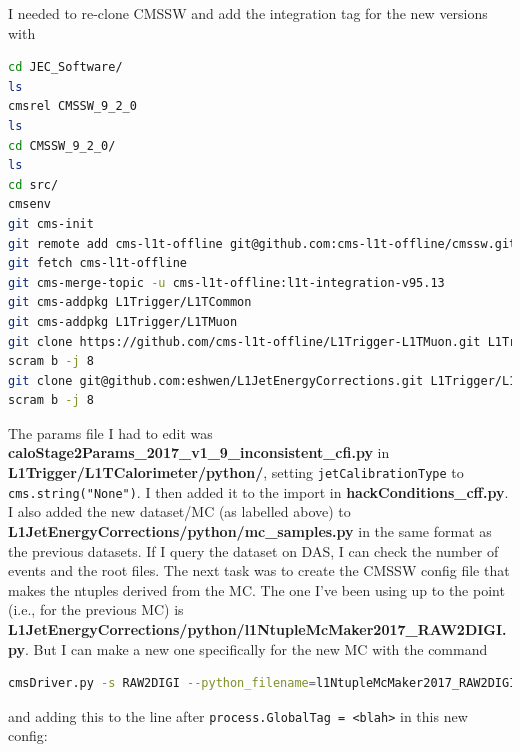 I needed to re-clone CMSSW and add the integration tag for the new versions with

\begin{lstlisting}[belowskip=-0.7cm, language=sh]
cd JEC_Software/
ls
cmsrel CMSSW_9_2_0
ls
cd CMSSW_9_2_0/
ls
cd src/
cmsenv
git cms-init
git remote add cms-l1t-offline git@github.com:cms-l1t-offline/cmssw.git
git fetch cms-l1t-offline
git cms-merge-topic -u cms-l1t-offline:l1t-integration-v95.13
git cms-addpkg L1Trigger/L1TCommon
git cms-addpkg L1Trigger/L1TMuon
git clone https://github.com/cms-l1t-offline/L1Trigger-L1TMuon.git L1Trigger/L1TMuon/data
scram b -j 8
git clone git@github.com:eshwen/L1JetEnergyCorrections.git L1Trigger/L1JetEnergyCorrections
scram b -j 8
\end{lstlisting}

The params file I had to edit was \textbf{caloStage2Params\_2017\_v1\_9\_inconsistent\_cfi.py} in \textbf{L1Trigger/L1TCalorimeter/python/}, setting \texttt{jetCalibrationType} to \texttt{cms.string("None")}. I then added it to the import in \textbf{hackConditions\_cff.py}. I also added the new dataset/MC (as labelled above) to \textbf{L1JetEnergyCorrections/python/mc\_samples.py} in the same format as the previous datasets. If I query the dataset on DAS, I can check the number of events and the root files. The next task was to create the CMSSW config file that makes the ntuples derived from the MC. The one I've been using up to the point (i.e., for the previous MC) is \textbf{L1JetEnergyCorrections/python/l1NtupleMcMaker2017\_RAW2DIGI.py}. But I can make a new one specifically for the new MC with the command

\begin{lstlisting}[belowskip=-0.7cm, language=sh, numbers=none]
cmsDriver.py -s RAW2DIGI --python_filename=l1NtupleMcMaker2017_RAW2DIGI_reEmu_HCAL_TPs.py -n 100 --no_output --no_exec --era=Run2_2017 --mc --conditions=92X_upgrade2017_TSG_For90XSamples_V1 --customise=L1Trigger/Configuration/customiseReEmul.L1TReEmulMCFrom90xRAWSimHcalTP --customise=L1Trigger/L1TNtuples/customiseL1Ntuple.L1NtupleRAWEMUGEN_MC --customise=L1Trigger/Configuration/customiseSettings.L1TSettingsToCaloStage2Params_2017_v1_9_inconsistent --filein=/store/mc/PhaseISpring17DR/QCD_Pt-15to3000_TuneCUETP8M1_Flat_13TeV_pythia8/GEN-SIM-RAW/FlatPU0to70NZS_90X_upgrade2017_realistic_v20-v1/120000/003FF53C-8232-E711-9340-7CD30ACE160C.root
\end{lstlisting}

and adding this to the line after \texttt{process.GlobalTag = <blah>} in this new config:

